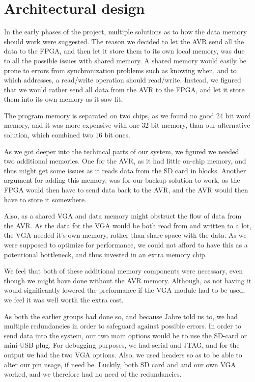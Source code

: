 \section {Architectural design}
In the early phases of the project, multiple solutions as to how the data memory should work were suggested. 
The reason we decided to let the AVR send all the data to the FPGA, and then let it store them to its own local memory, 
was due to all the possible issues with shared memory. A shared memory would easily be prone to errors from synchronization 
problems such as knowing when, and to which addresses, a read/write operation should read/write. 
Instead, we figured that we would rather send all data from the AVR to the FPGA, and let it store them into its own memory as it saw fit.

The program memory is separated on two chips, as we found no good 24 bit word memory, and it was more expensive with one 32 bit memory, 
than our alternative solution, which combined two 16 bit ones. 

As we got deeper into the techincal parts of our system, we figured we needed two additional memories. 
One for the AVR, as it had little on-chip memory, and thus might get some issues as it reads data from the SD card in blocks. 
Another argument for adding this memory, was for our backup solution to work, as the FPGA would then have to send data back to the AVR, and the AVR would then have to store it somewhere.

Also, as a shared VGA and data memory might obstruct the flow of data from the AVR. 
As the data for the VGA would be both read from and written to a lot, the VGA needed it's own memory, 
rather than share space with the data. As we were supposed to optimize for performance, we could not 
afford to have this as a potentional bottleneck, and thus invested in an extra memory chip.

We feel that both of these additional memory components were necessary, even though we might have done 
without the AVR memory. Although, as not having it would significantly lowered the preformance if 
the VGA module had to be used, we feel it was well worth the extra cost. 

As both the earlier groups had done so, and because Jahre told us to, we had multiple redundancies in order 
to safeguard against possible errors. In order to send data into the system, our two main options would be 
to use the SD-card or mini-USB plug. For debugging purposes, we had serial and JTAG, and for the output we 
had the two VGA options. Also, we used headers so as to be able to alter our pin usage, if need be. 
Luckily, both SD card and and our own VGA worked, and we therefore had no need of the redundancies. 
